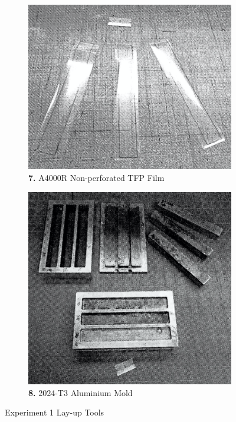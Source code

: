 \begin{figure}[!h]
  \medskip

  \begin{subfigure}[t]{.4\textwidth}
    \centering
    \includegraphics[width=\linewidth]{Pictures/Apparatus/Experiment 1/six.png}
    \caption{\textbf{7.} A4000R Non-perforated TFP Film}
  \end{subfigure}
  \hfill
  \begin{subfigure}[t]{.4\textwidth}
    \centering
    \includegraphics[width=\linewidth]{Pictures/Apparatus/Experiment 1/seven.png}
    \caption{\textbf{8.} 2024-T3 Aluminium Mold}
  \end{subfigure}
  \caption{Experiment 1 Lay-up Tools}
  \label{fig:exp1b}
\end{figure}

